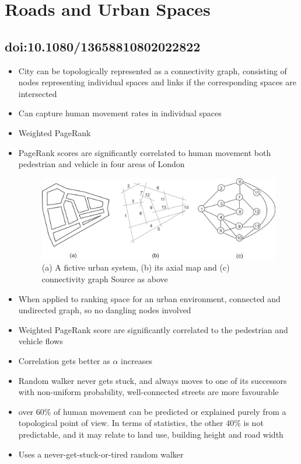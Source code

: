 \documentclass[11pt]{report}
\begin{document}
\chapter{Roads and Urban Spaces}
\section{doi:10.1080/13658810802022822}
\begin{itemize}
\item City can be topologically represented as a connectivity graph, consisting of nodes representing individual spaces and links if the corresponding spaces are intersected
\item Can capture human movement rates in individual spaces
\item Weighted PageRank
\item PageRank scores are significantly correlated to human movement both pedestrian and vehicle in four areas of London
\begin{figure}
\includegraphics[width=\linewidth]{map_view.jpeg}
\caption{(a) A fictive urban system, (b) its axial map and (c) connectivity graph Source as above}
\label{fig:map}
\end{figure}
\item When applied to ranking space for an urban environment, connected and undirected graph, so no dangling nodes involved
\item Weighted PageRank score are significantly correlated to the pedestrian and vehicle flows
\item Correlation gets better as $\alpha$ increases
\item Random walker never gets stuck, and always moves to one of its successors with non-uniform probability, well-connected streets are more favourable
\item over 60\% of human movement can be predicted or explained purely from a topological point of view. In terms of statistics, the other 40\% is not predictable, and it may relate to land use, building height and road width
\item Uses a never-get-stuck-or-tired random walker
\end{itemize}
\end{document}

